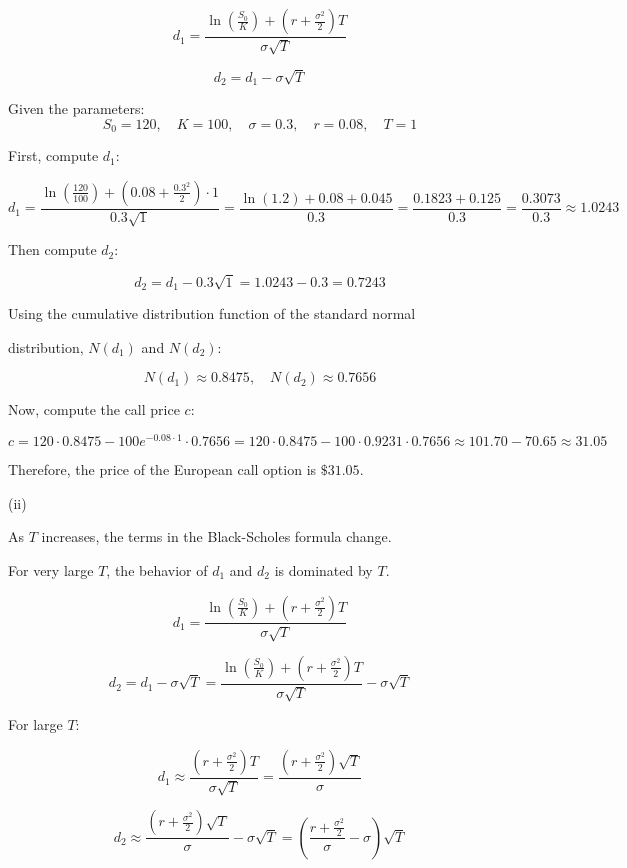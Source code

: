 \documentclass{article}
\begin{document}
\[
d_1 = \frac{\ln\left(\frac{S_0}{K}\right) + \left(r + \frac{\sigma^2}{2}\right)T}{\sigma \sqrt{T}}
\]

\[
d_2 = d_1 - \sigma \sqrt{T}
\]

Given the parameters:
\[
S_0 = 120, \quad K = 100, \quad \sigma = 0.3, \quad r = 0.08, \quad T = 1
\]

First, compute \( d_1 \):

\[
d_1 = \frac{\ln\left(\frac{120}{100}\right) + \left(0.08 + \frac{0.3^2}{2}\right) \cdot 1}{0.3 \sqrt{1}} = \frac{\ln(1.2) + 0.08 + 0.045}{0.3} = \frac{0.1823 + 0.125}{0.3} = \frac{0.3073}{0.3} \approx 1.0243
\]

Then compute \( d_2 \):

\[
d_2 = d_1 - 0.3 \sqrt{1} = 1.0243 - 0.3 = 0.7243
\]

Using the cumulative distribution function of the standard normal 

distribution, \( N(d_1) \) and \( N(d_2) \):

\[
N(d_1) \approx 0.8475, \quad N(d_2) \approx 0.7656
\]

Now, compute the call price \( c \):

\[
c = 120 \cdot 0.8475 - 100 e^{-0.08 \cdot 1} \cdot 0.7656 = 120 \cdot 0.8475 - 100 \cdot 0.9231 \cdot 0.7656 \approx 101.70 - 70.65 \approx 31.05
\]

Therefore, the price of the European call option is \( \boxed{\$31.05} \).

\vspace{\baselineskip}

(ii) 


As \( T \) increases, the terms in the Black-Scholes formula change. 

For very large \( T \), the behavior of \( d_1 \) and \( d_2 \) is dominated by \( T \).

\[
d_1 = \frac{\ln\left(\frac{S_0}{K}\right) + \left(r + \frac{\sigma^2}{2}\right)T}{\sigma \sqrt{T}}
\]

\[
d_2 = d_1 - \sigma \sqrt{T} = \frac{\ln\left(\frac{S_0}{K}\right) + \left(r + \frac{\sigma^2}{2}\right)T}{\sigma \sqrt{T}} - \sigma \sqrt{T}
\]

For large \( T \):

\[
d_1 \approx \frac{(r + \frac{\sigma^2}{2})T}{\sigma \sqrt{T}} = \frac{(r + \frac{\sigma^2}{2})\sqrt{T}}{\sigma}
\]

\[
d_2 \approx \frac{(r + \frac{\sigma^2}{2})\sqrt{T}}{\sigma} - \sigma \sqrt{T} = \left(\frac{r + \frac{\sigma^2}{2}}{\sigma} - \sigma\right) \sqrt{T}
\]
\end{document}
